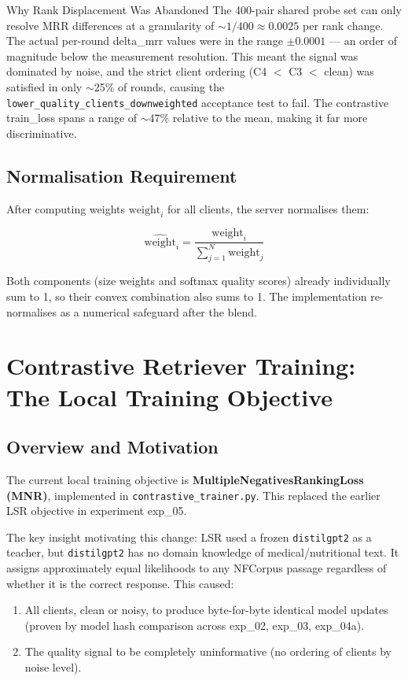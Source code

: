 \documentclass[12pt,a4paper]{article}
\begin{document}
\begin{warnbox}{Why Rank Displacement Was Abandoned}
  The 400-pair shared probe set can only resolve MRR differences at a granularity of $\sim 1/400 \approx 0.0025$ per rank change. The actual per-round delta\_mrr values were in the range $\pm 0.0001$ --- an order of magnitude below the measurement resolution. This meant the signal was dominated by noise, and the strict client ordering (C4 $<$ C3 $<$ clean) was satisfied in only $\sim$25\% of rounds, causing the \texttt{lower\_quality\_clients\_downweighted} acceptance test to fail. The contrastive train\_loss spans a range of $\sim$47\% relative to the mean, making it far more discriminative.
\end{warnbox}

\subsection{Normalisation Requirement}

After computing weights $\text{weight}_i$ for all clients, the server normalises them:

\begin{equation}
  \hat{\text{weight}}_i = \frac{\text{weight}_i}{\sum_{j=1}^{N} \text{weight}_j}
  \label{eq:normalise}
\end{equation}

Both components (size weights and softmax quality scores) already individually sum to 1, so their convex combination also sums to 1. The implementation re-normalises as a numerical safeguard after the blend.

\section{Contrastive Retriever Training: The Local Training Objective}

\subsection{Overview and Motivation}

The current local training objective is \textbf{MultipleNegativesRankingLoss (MNR)}, implemented in \texttt{contrastive\_trainer.py}. This replaced the earlier LSR objective in experiment exp\_05.

The key insight motivating this change: LSR used a frozen \texttt{distilgpt2} as a teacher, but \texttt{distilgpt2} has no domain knowledge of medical/nutritional text. It assigns approximately equal likelihoods to any NFCorpus passage regardless of whether it is the correct response. This caused:
\begin{enumerate}
  \item All clients, clean or noisy, to produce byte-for-byte identical model updates (proven by model hash comparison across exp\_02, exp\_03, exp\_04a).
  \item The quality signal to be completely uninformative (no ordering of clients by noise level).
\end{enumerate}
\end{document}
